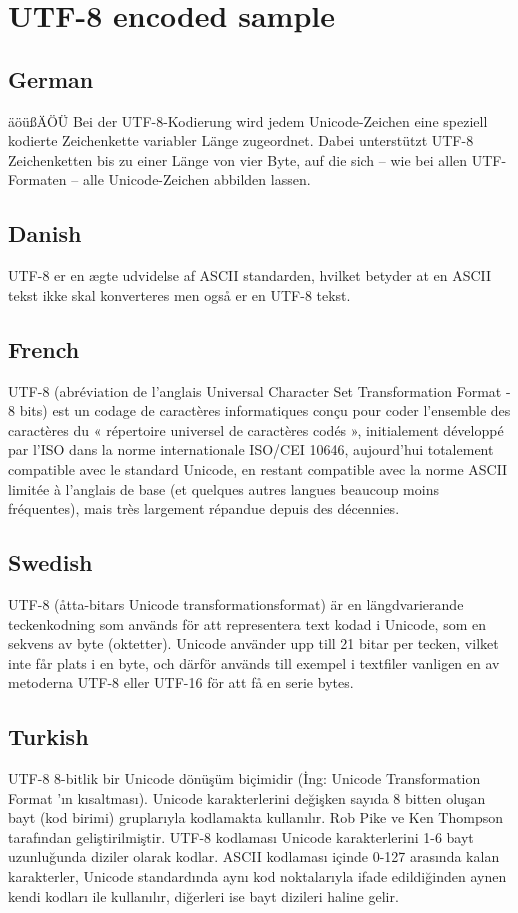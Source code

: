 \chapter{UTF-8 encoded sample}

\section{German}
äöüßÄÖÜ Bei der UTF-8-Kodierung wird jedem Unicode-Zeichen eine speziell kodierte Zeichenkette variabler Länge zugeordnet. Dabei unterstützt UTF-8 Zeichenketten bis zu einer Länge von vier Byte, auf die sich – wie bei allen UTF-Formaten – alle Unicode-Zeichen abbilden lassen.

\section{Danish}
UTF-8 er en ægte udvidelse af ASCII standarden, hvilket betyder at en ASCII tekst ikke skal konverteres men også er en UTF-8 tekst.

\section{French}
UTF-8 (abréviation de l’anglais Universal Character Set Transformation Format - 8 bits) est un codage de caractères informatiques conçu pour coder l’ensemble des caractères du « répertoire universel de caractères codés », initialement développé par l’ISO dans la norme internationale ISO/CEI 10646, aujourd’hui totalement compatible avec le standard Unicode, en restant compatible avec la norme ASCII limitée à l’anglais de base (et quelques autres langues beaucoup moins fréquentes), mais très largement répandue depuis des décennies.

\section{Swedish}
UTF-8 (åtta-bitars Unicode transformationsformat) är en längdvarierande teckenkodning som används för att representera text kodad i Unicode, som en sekvens av byte (oktetter). Unicode använder upp till 21 bitar per tecken, vilket inte får plats i en byte, och därför används till exempel i textfiler vanligen en av metoderna UTF-8 eller UTF-16 för att få en serie bytes.

\section{Turkish}
UTF-8 8-bitlik bir Unicode dönüşüm biçimidir (İng: Unicode Transformation Format 'ın kısaltması). Unicode karakterlerini değişken sayıda 8 bitten oluşan bayt (kod birimi) gruplarıyla kodlamakta kullanılır. Rob Pike ve Ken Thompson tarafından geliştirilmiştir. UTF-8 kodlaması Unicode karakterlerini 1-6 bayt uzunluğunda diziler olarak kodlar. ASCII kodlaması içinde 0-127 arasında kalan karakterler, Unicode standardında aynı kod noktalarıyla ifade edildiğinden aynen kendi kodları ile kullanılır, diğerleri ise bayt dizileri haline gelir.

